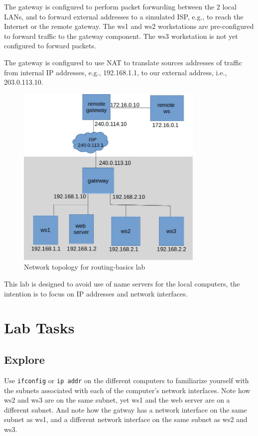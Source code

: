 The gateway is configured to perform packet forwarding between the 2 local LANs, and to
forward external addresses to a simulated ISP, e.g., to reach the Internet or the remote
gateway.
The ws1 and ws2 workstations are pre-configured to forward traffic to the gateway
component.  The ws3 workstation is not yet configured to forward packets.

The gateway is configured to use NAT to translate
sources addresses of traffic from internal IP addresses, e.g., 192.168.1.1, to
our external address, i.e., 203.0.113.10.

\begin{figure}[H]
\begin{center}
\includegraphics [width=0.8\textwidth]{routing-basics.jpg}
\end{center}
\caption{Network topology for routing-basics lab}
\label{fig:topology}
\end{figure}

This lab is designed to avoid use of name servers for the local computers, the intention is to focus
on IP addresses and network interfaces.

\section{Lab Tasks}
\subsection{Explore}
Use {\tt ifconfig} or {\tt ip addr} on the different computers to familiarize yourself with
the subnets associated with each of the computer's network interfaces.
Note how ws2 and ws3 are on the same subnet, yet ws1 and the web server are on a different subnet.
And note how the gatway has a network interface on the same subnet as ws1, and a different
network interface on the same subnet as ws2 and ws3.

